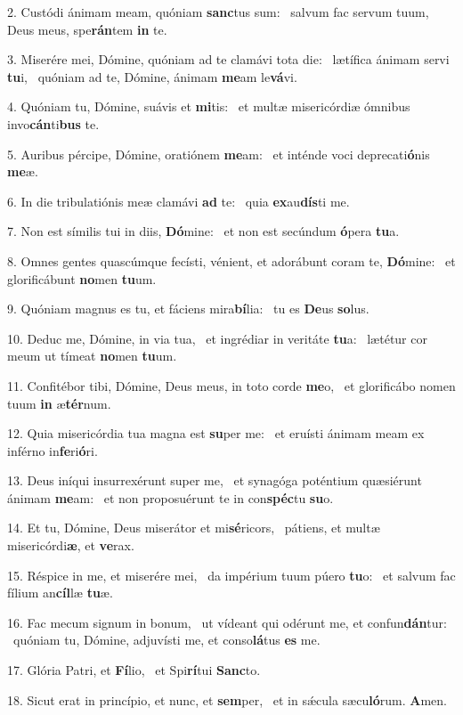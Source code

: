 2. Custódi ánimam meam, quóniam \textbf{sanc}tus sum: \ast\  salvum fac servum tuum, Deus meus, spe\textbf{rán}tem \textbf{in} te.\

3. Miserére mei, Dómine, quóniam ad te clamávi tota die: \dag\  lætífica ánimam servi \textbf{tu}i, \ast\  quóniam ad te, Dómine, ánimam \textbf{me}am le\textbf{vá}vi.\

4. Quóniam tu, Dómine, suávis et \textbf{mi}tis: \ast\  et multæ misericórdiæ ómnibus invo\textbf{cán}ti\textbf{bus} te.\

5. Auribus pércipe, Dómine, oratiónem \textbf{me}am: \ast\  et inténde voci deprecati\textbf{ó}nis \textbf{me}æ.\

6. In die tribulatiónis meæ clamávi \textbf{ad} te: \ast\  quia \textbf{ex}au\textbf{dís}ti me.\

7. Non est símilis tui in diis, \textbf{Dó}mine: \ast\  et non est secúndum \textbf{ó}pera \textbf{tu}a.\

8. Omnes gentes quascúmque fecísti, vénient, et adorábunt coram te, \textbf{Dó}mine: \ast\  et glorificábunt \textbf{no}men \textbf{tu}um.\

9. Quóniam magnus es tu, et fáciens mira\textbf{bí}lia: \ast\  tu es \textbf{De}us \textbf{so}lus.\

10. Deduc me, Dómine, in via tua, \dag\  et ingrédiar in veritáte \textbf{tu}a: \ast\  lætétur cor meum ut tímeat \textbf{no}men \textbf{tu}um.\

11. Confitébor tibi, Dómine, Deus meus, in toto corde \textbf{me}o, \ast\  et glorificábo nomen tuum \textbf{in} æ\textbf{tér}num.\

12. Quia misericórdia tua magna est \textbf{su}per me: \ast\  et eruísti ánimam meam ex inférno in\textbf{fe}ri\textbf{ó}ri.\

13. Deus iníqui insurrexérunt super me, \dag\  et synagóga poténtium quæsiérunt ánimam \textbf{me}am: \ast\  et non proposuérunt te in con\textbf{spéc}tu \textbf{su}o.\

14. Et tu, Dómine, Deus miserátor et mi\textbf{sé}ricors, \ast\  pátiens, et multæ misericórdi\textbf{æ}, et \textbf{ve}rax.\

15. Réspice in me, et miserére mei, \dag\  da impérium tuum púero \textbf{tu}o: \ast\  et salvum fac fílium an\textbf{cíl}læ \textbf{tu}æ.\

16. Fac mecum signum in bonum, \dag\  ut vídeant qui odérunt me, et confun\textbf{dán}tur: \ast\  quóniam tu, Dómine, adjuvísti me, et conso\textbf{lá}tus \textbf{es} me.\

17. Glória Patri, et \textbf{Fí}lio, \ast\  et Spi\textbf{rí}tui \textbf{Sanc}to.\

18. Sicut erat in princípio, et nunc, et \textbf{sem}per, \ast\  et in sǽcula sæcu\textbf{ló}rum. \textbf{A}men.\

